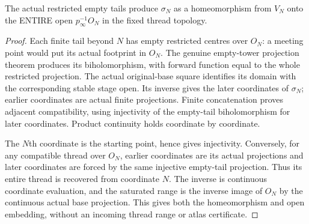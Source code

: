 \begin{lemma}
\label{hir:actual-thread-lf-saturated-charts}
\leanok
{}
The actual restricted empty tails produce $\sigma_N$ as a homeomorphism from
$V_N$ onto the ENTIRE open $p_\infty^{-1}O_N$ in the fixed thread topology.
\end{lemma}
\begin{proof}
Each finite tail beyond $N$ has empty restricted centres over $O_N$:
a meeting point would put its actual footprint in $O_N$. The genuine
empty-tower projection theorem produces its biholomorphism, with forward
function equal to the whole restricted projection. The actual original-base
square identifies its domain with the corresponding stable stage open.
Its inverse gives the later coordinates of $\sigma_N$; earlier coordinates
are actual finite projections. Finite concatenation proves adjacent
compatibility, using injectivity of the empty-tail biholomorphism for later
coordinates. Product continuity holds coordinate by coordinate.

The $N$th coordinate is the starting point, hence gives injectivity.
Conversely, for any compatible thread over $O_N$, earlier coordinates are
its actual projections and later coordinates are forced by the same injective
empty-tail projection. Thus its entire thread is recovered from coordinate
$N$. The inverse is continuous coordinate evaluation, and the saturated range
is the inverse image of $O_N$ by the continuous actual base projection.
This gives both the homeomorphism and open embedding, without an incoming
thread range or atlas certificate.
\end{proof}

